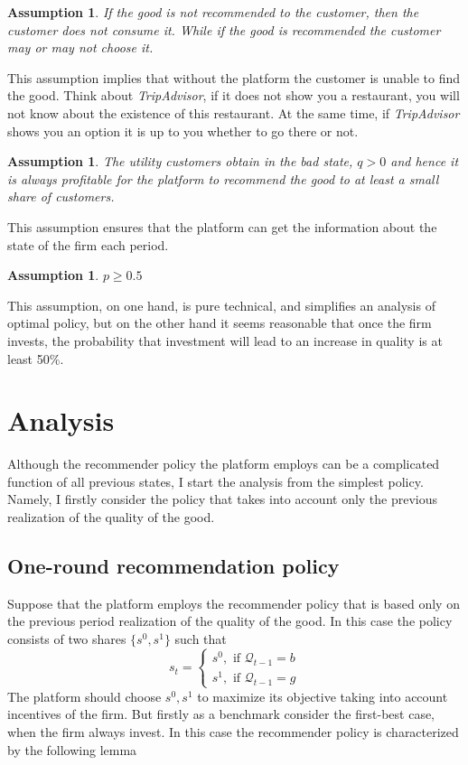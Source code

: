 \documentclass[a4paper]{article}
\newtheorem{assumption}[theorem]{Assumption}
\begin{document}
 	\begin{assumption}
 		If the good is not recommended to the customer, then the customer does not consume it. While if the good is recommended the customer may or may not choose it.
 	\end{assumption}
 	This assumption implies that without the platform the customer is unable to find the good. Think about \textit{TripAdvisor}, if it does not show you a restaurant, you will not know about the existence of this restaurant. At the same time, if \textit{TripAdvisor} shows you an option it is up to you whether to go there or not.
 	\begin{assumption}
 		The utility customers obtain in the bad state, $q > 0$ and hence it is always profitable for the platform to recommend the good to at least a small share of customers.
 	\end{assumption}
 This assumption ensures that the platform can get the information about the state of the firm each period.
 \begin{assumption}
 	$p \ge 0.5$
 \end{assumption}
This assumption, on one hand, is pure technical, and simplifies an analysis of optimal policy, but on the other hand it seems reasonable that once the firm invests, the probability that investment will lead to an increase in quality is at least 50\%.
\section{Analysis}
Although the recommender policy the platform employs can be a complicated function of all previous states, I start the analysis from the simplest policy. Namely, I firstly consider the policy that takes into account only the previous realization of the quality of the good.
\subsection{One-round recommendation policy}
Suppose that the platform employs the recommender policy that is based only on the previous period realization of the quality of the good. In this case the policy consists of two shares $\{s^0, s^1\}$ such that $$s_t = \begin{cases}
s^0, \text{ if }\mathcal{Q}_{t-1} = b\\
s^1, \text{ if }\mathcal{Q}_{t-1} = g
\end{cases}$$
The platform should choose $s^0, s^1$ to maximize its objective taking into account incentives of the firm. But firstly as a benchmark consider the first-best case, when the firm always invest. In this case the recommender policy is characterized by the following lemma
\end{document}
